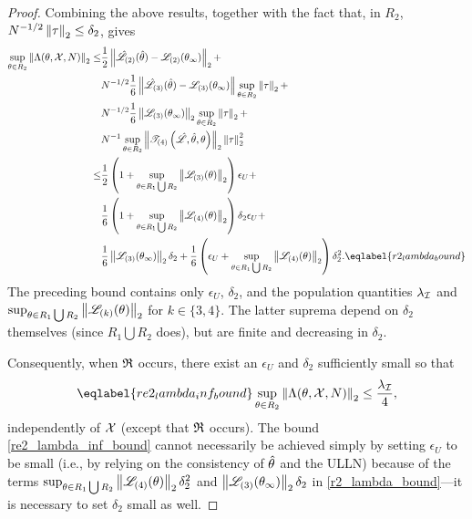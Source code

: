 \begin{proof}
Combining the above results, together with the fact that, in $R_2$, $N^{-1/2}
\left\Vert \tau\right\Vert_2 \le \delta_2$, gives
%
\begin{align}
%
\sup_{\theta \in R_2} \norm{\Lambda(\theta, \xvec, N)}_2 \le&
    \frac{1}{2} \norm{\likhatk{2}(\thetahat) - \likk{2}(\thetatrue)}_2 +
        \nonumber\\&
    N^{-1/2} \frac{1}{6}\norm{
        \likhatk{3}(\thetahat) -
        \likk{3}(\thetatrue)
    } \sup_{\theta \in R_2} \norm{\tau}_2 +
        \nonumber\\&
    N^{-1/2} \frac{1}{6} \norm{\likk{3}(\thetatrue)}_2
        \sup_{\theta \in R_2} \norm{\tau}_2 +
        \nonumber\\&
    N^{-1} \sup_{\theta \in R_2}
        \norm{\tresid{4}{\likhat, \thetahat, \theta}}_2 \norm{\tau}_2^2
\nonumber\\\le&
    \frac{1}{2} \left(1 + \sup_{\theta \in R_1 \bigcup R_2} \norm{\likk{3}(\theta)}_2\right)
        \epsilon_U + \nonumber\\
&   \frac{1}{6} \left(1 + \sup_{\theta \in R_1 \bigcup R_2} \norm{\likk{4}(\theta)}_2\right)
    \delta_2 \epsilon_U + \nonumber\\
&   \frac{1}{6} \norm{\likk{3}(\thetatrue)}_2 \delta_2 +
   \frac{1}{6} \left(
        \epsilon_U + \sup_{\theta \in R_1 \bigcup R_2} \norm{\likk{4}(\theta)}_2 \right)
    \delta_2^2. \eqlabel{r2_lambda_bound}
%
\end{align}
%
The preceding bound contains only $\epsilon_U$, $\delta_2$, and the
population quantities $\lambda_\mathcal{I}$ and $\sup_{\theta \in R_1 \bigcup R_2}
\left\Vert \mathscr{L}_{(k)}(\theta)\right\Vert_2$ for $k \in \{3, 4\}$.  The latter suprema depend on
$\delta_2$ themselves (since $R_1 \bigcup R_2$ does), but are finite and
decreasing in $\delta_2$.

Consequently, when $\mathfrak{R}$ occurs, there exist an $\epsilon_U$ and
$\delta_2$ sufficiently small so that
%
\begin{align}\eqlabel{re2_lambda_inf_bound}
%
\sup_{\theta \in R_2} \norm{\Lambda(\theta, \xvec, N)}_2 \le \frac{\infoev}{4},
%
\end{align}
%
independently of ${\mathcal{X}}$ (except that $\mathfrak{R}$ occurs). The bound
\eqref{re2_lambda_inf_bound} cannot necessarily be achieved simply by
setting $\epsilon_U$ to be small (i.e., by relying on the consistency of
$\hat\theta$ and the ULLN) because of the terms $\sup_{\theta \in R_1 \bigcup R_2}
\left\Vert \mathscr{L}_{(4)}(\theta)\right\Vert_2 \delta_2^2$ and $\left\Vert \mathscr{L}_{(3)}(\theta_{\infty})\right\Vert_2
\delta_2$ in \eqref{r2_lambda_bound}---it is necessary to set $\delta_2$
small as well.


\end{proof}
